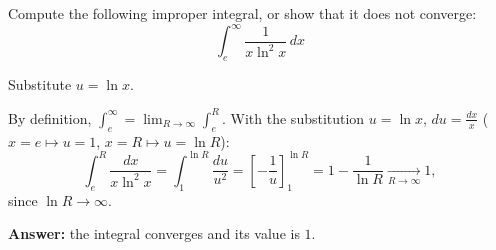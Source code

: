 
\begin{question}
Compute the following improper integral, or show that it does not converge:
\[ \int_e^\infty\frac{1}{x\ln^2 x}\,dx \]
\end{question}

\begin{hint}
Substitute $u = \ln x$.
\end{hint}

\begin{solution}
By definition, $\int_e^\infty = \lim_{R\to\infty}\int_e^R$. With the substitution $u = \ln x$, $du = \frac{dx}{x}$ ($x = e \mapsto u = 1$, $x = R\mapsto u = \ln R$):
\[ \int_e^R\frac{dx}{x\ln^2x} = \int_1^{\ln R}\frac{du}{u^2} = \left[-\frac1u\right]_1^{\ln R} = 1 - \frac{1}{\ln R} \xrightarrow[R\to\infty]{} 1, \]
since $\ln R \to \infty$.

\textbf{Answer:} the integral converges and its value is $1$.
\end{solution}
